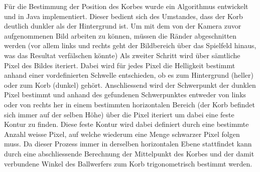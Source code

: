 	Für die Bestimmung der Position des Korbes wurde ein Algorithmus entwickelt und in Java implementiert. Dieser bedient sich des Umstandes, dass der Korb deutlich dunkler als der Hintergrund ist. Um mit dem von der Kamera zuvor aufgenommenen Bild arbeiten zu können, müssen die Ränder abgeschnitten werden (vor allem links und rechts geht der Bildbereich über das Spielfeld hinaus, was das Resultat verfälschen könnte) Als zweiter Schritt wird über sämtliche Pixel des Bildes iteriert. Dabei wird für jedes Pixel die Helligkeit bestimmt anhand einer vordefinierten Schwelle entschieden, ob es zum Hintergrund (heller) oder zum Korb (dunkel) gehört. Anschliessend wird der Schwerpunkt der dunklen Pixel bestimmt und anhand des gefundenen Schwerpunktes entweder von links oder von rechts her in einem bestimmten horizontalen Bereich (der Korb befindet sich immer auf der selben Höhe) über die Pixel iteriert um dabei eine feste Kontur zu finden. Diese feste Kontur wird dabei definiert durch eine bestimmte Anzahl weisse Pixel, auf welche wiederum eine Menge schwarzer Pixel folgen muss. Da dieser Prozess immer in derselben horizontalen Ebene stattfindet kann durch eine abschliessende Berechnung der Mittelpunkt des Korbes und der damit verbundene Winkel des Ballwerfers zum Korb trigonometrisch bestimmt werden.\\
	